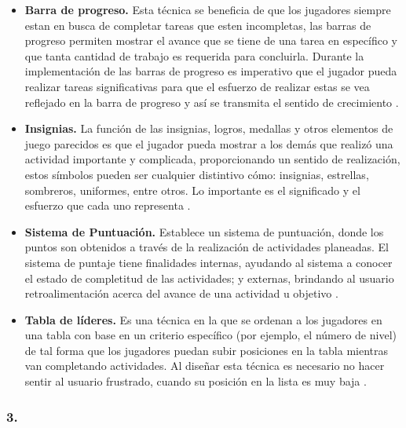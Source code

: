     \begin{itemize}
    \item
    {\bf Barra de progreso.}
        Esta técnica se beneficia de que los jugadores siempre estan en busca de completar tareas
        que esten incompletas, las barras de progreso permiten mostrar el avance que se tiene de una
        tarea en específico y que tanta cantidad de trabajo es requerida para concluirla. Durante la
        implementación de las barras de progreso es imperativo que el jugador pueda realizar tareas
        significativas para que el esfuerzo de realizar estas se vea reflejado en la barra de progreso
        y así se transmita el sentido de crecimiento \cite[p. 113]{Octalysis}.
        
    \item
    {\bf Insignias.}
        La función de las insignias, logros, medallas y otros elementos de juego parecidos es que el
        jugador pueda mostrar a los demás que realizó una actividad importante y complicada, proporcionando
        un sentido de realización, estos símbolos pueden ser cualquier distintivo cómo: insignias,
        estrellas, sombreros, uniformes, entre otros. Lo importante es el significado y el esfuerzo
        que cada uno representa \cite[p. 117]{Octalysis}.
        
    \item
    {\bf Sistema de Puntuación.} %
        Establece un sistema de puntuación, donde los puntos son obtenidos a través de la realización
        de actividades planeadas. El sistema de puntaje tiene finalidades internas, ayudando al sistema
        a conocer el estado de completitud de las actividades; y externas, brindando al usuario
        retroalimentación acerca del avance de una actividad u objetivo \cite[p. 118]{Octalysis}. 
        
    \item
    {\bf Tabla de líderes.}
        Es una técnica en la que se ordenan a los jugadores en una tabla con base en un criterio específico
        (por ejemplo, el número de nivel) de tal forma que los jugadores puedan subir posiciones en la
        tabla mientras van completando actividades. Al diseñar esta técnica es necesario no hacer
        sentir al usuario frustrado, cuando su posición en la lista es muy baja \cite[p. 121]{Octalysis}.
    \end{itemize}
  

\subsubsection{3. \principioIII} \label{subsec:prinpcioIII}
    
